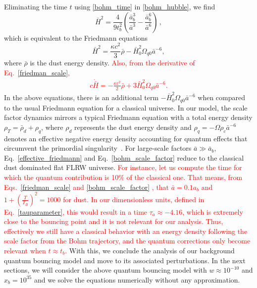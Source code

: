 \documentclass[a4paper,11pt]{article}
\newcommand{\dpar}[1]{\left(#1 \right)}
\begin{document}
        Eliminating the time $t$ using \eqref{bohm_time} in \eqref{bohm_hubble}, we find 
        \begin{equation}
        \label{friedman_scale}
            \bar{H}^{2} = \frac{ 4 }{ 9t^{2}_{b}}\dpar
{ \frac{ \bar{a}^{3}_{b} }{ \bar{a}^{3} } - \frac{\bar{a}_{b}^{6}}{ \bar{a}^{6} } }\, ,
        \end{equation}
        which is equivalent to the Friedmann equations
        \begin{equation}\label{effective_friedmann}
            \bar{H}^{2} = \frac{ \kappa c^{2} }{ 3 }\bar\rho - \bar{H}^{2}_{0}\Omega_{q0}\bar{a}^{-6},
        \end{equation}
        where $\bar\rho$ is the dust energy density. \textcolor{red}{Also, from the derivative of Eq.~\eqref{friedman_scale},
        \begin{align}
         c\dot{\bar{H}} = - \frac{\kappa c^{2}}{2} \bar\rho + 3\bar{H}^{2}_{0}\Omega_{q0}\bar{a}^{-6}    
        .\end{align}
        }
 In the above equations, there is an additional term $- \bar{H}^{2}_{0}\Omega_{q0}\bar{a}^{-6}$ when compared to the usual Friedmann equation for a classical universe. In our model, the scale factor dynamics mirrors a typical Friedmann equation with a total energy density $\rho_{T} = \bar\rho_{d} + \rho_{q}$, where $\rho_{d}$ represents the dust energy density and $\rho_{q} = -\Omega\rho_{c}\bar{a}^{-6}$ denotes an effective negative energy density accounting for quantum effects that circumvent the primordial singularity~\cite{vitenti2012large}. For large-scale factors $\bar{a} \gg \bar{a}_{b} $, Eq.~\eqref{effective_friedmann} and Eq.~\eqref{bohm_scale_factor} reduce to the classical dust dominated flat FLRW universe.
        \textcolor{red}{For instance, let us compute the time for which the quantum contribution is 10\% of the classical one. That means, from Eqs.~\eqref{friedman_scale} and \eqref{bohm_scale_factor} , that $\bar{a} = 0.1 a_b$ and $1 + \left(\frac{T}{T_B}\right)^2 = 1000$ for dust. In our dimensionless units, defined in Eq.~\eqref{tauparameter}, this would result in a time $\tau_a \approx -4.16$, which is extremely close to the bouncing point and it is not relevant for our analysis. Thus, effectively we still have a classical behavior with an energy density following the scale factor from the Bohm trajectory, and the quantum corrections only become relevant when $t \approx t_b$.}
         With this, we conclude the analysis of our background quantum bouncing model and move to its associated perturbations. In the next sections, we will consider the above quantum bouncing model with $w\approx 10^{-10}$ and $x_b = 10^{35}$ and we solve the equations numerically without any approximation.
        
\end{document}
